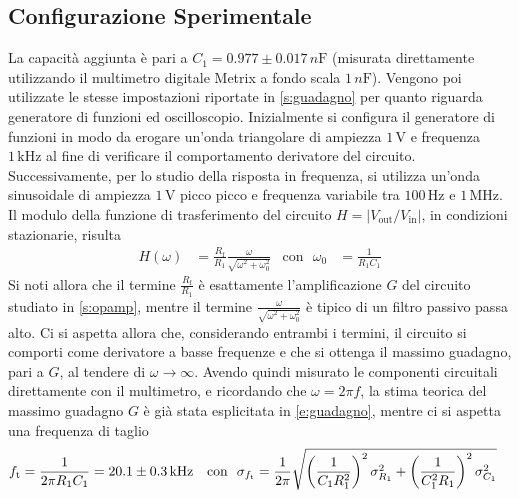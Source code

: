 \documentclass[a4paper,11pt]{article} %
\begin{document}
\subsection{Configurazione Sperimentale}
La capacità aggiunta è pari a $C_{1} = 0.977 \pm 0.017 \,\si{n\farad}$ (misurata direttamente utilizzando il multimetro
digitale Metrix a fondo scala $1\,\si{n\farad}$). Vengono poi utilizzate le stesse impostazioni riportate in
\autoref{s:guadagno} per quanto riguarda generatore di funzioni ed oscilloscopio. Inizialmente si configura il
generatore di funzioni in modo da erogare un'onda triangolare di ampiezza $1\,\si{\volt}$ e frequenza $1\,\si{\kHz}$ al
fine di verificare il comportamento derivatore del circuito. Successivamente, per lo studio della risposta in frequenza,
si utilizza un'onda sinusoidale di ampiezza $1\,\si{\volt}$ picco picco e frequenza variabile tra $100\,\si{\Hz}$ e
$1\,\si{\MHz}$. Il modulo della funzione di trasferimento del circuito $H=\left|V_{\text{out}}/V_{\text{in}}\right|$, in
condizioni stazionarie, risulta
\begin{align}
	H(\omega) &= \frac{R_{\text{f}}}{R_{1}}\frac{\omega}{\sqrt{\omega^2+\omega_0^2}} & \text{con}\,\,\,\, \omega_{0}&=\frac{1}{R_{1}C_{1}}
\end{align}
\noindent Si noti allora che il termine $\frac{R_{\text{f}}}{R_{1}}$ è esattamente l'amplificazione $G$ del circuito
studiato in \autoref{s:opamp}, mentre il termine $\frac{\omega}{\sqrt{\omega^2+\omega_0^2}}$ è tipico di un filtro
passivo passa alto. Ci si aspetta allora che, considerando entrambi i termini, il circuito si comporti come derivatore a
basse frequenze e che si ottenga il massimo guadagno, pari a $G$, al tendere di $\omega\rightarrow\infty$. Avendo quindi
misurato le componenti circuitali direttamente con il multimetro, e ricordando che $\omega=2\pi f$, la stima teorica del
massimo guadagno $G$ è già stata esplicitata in \autoref{e:guadagno}, mentre ci si aspetta una frequenza di taglio
\begin{align}\label{e:diff_f_th}
	f_{\text{t}}&=\frac{1}{2\pi R_{1}C_{1}}=20.1 \pm 0.3 \,\si{k\Hz} & 
	\text{con\,\,\,\,}\sigma_{f_{\text{t}}}&=\frac{1}{2\pi}\sqrt{	\left(\frac{1}{C_{1}R_{1}^2}\right)^2\sigma_{R_{1}}^2	+
																	\left(\frac{1}{C_{1}^2R_{1}}\right)^2\sigma_{C_{1}}^2   }																	
\end{align}


\end{document}
